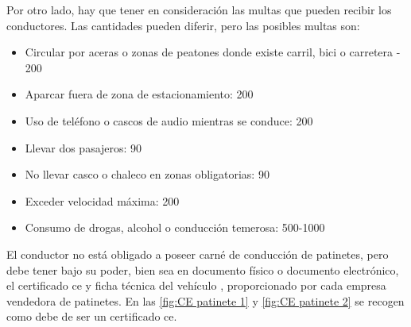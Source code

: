 Por otro lado, hay que tener en consideración las multas \cite{normativapatinete} que pueden recibir los conductores. Las cantidades pueden diferir, pero las posibles multas son:
\begin{itemize}
    \item Circular por aceras o zonas de peatones donde existe carril, bici o carretera - 200 
    \item Aparcar fuera de zona de estacionamiento: 200 
    \item Uso de teléfono o cascos de audio mientras se conduce: 200 
    \item Llevar dos pasajeros: 90 
    \item No llevar casco o chaleco en zonas obligatorias: 90 
    \item Exceder velocidad máxima: 200 
    \item Consumo de drogas, alcohol o conducción temerosa: 500-1000 
\end{itemize}

El conductor no está obligado a poseer carné de conducción de patinetes, pero debe tener bajo su poder, bien sea en documento físico o documento electrónico, el certificado \gls{ce} y ficha técnica del vehículo \cite{cetallerdelpatinete}, proporcionado por cada empresa vendedora de patinetes. En las \autoref{fig:CE patinete 1} y \autoref{fig:CE patinete 2} \cite{ceejemplo} se recogen como debe de ser un certificado \gls{ce}.


